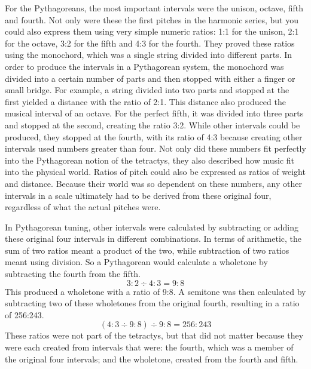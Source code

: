 For the Pythagoreans, the most important intervals were the unison, octave, fifth and
fourth.  Not only were these the first pitches in the harmonic series, but you could also
express them using very simple numeric ratios: 1:1 for the unison, 2:1 for the octave, 3:2
for the fifth and 4:3 for the fourth. They proved these ratios using the monochord, which
was a single string divided into different parts.  In order to
produce the intervals in a Pythagorean system, the monochord was divided into a
certain number of parts and then stopped with either a finger or small bridge.  For
example, a string divided into two parts and stopped at the first yielded
a distance with the ratio of 2:1.  This distance also produced the musical interval of
an octave.  For the perfect fifth, it was divided into three parts and stopped at the
second, creating the ratio 3:2.  While other intervals could be produced, they stopped
at the fourth, with its ratio of 4:3 because creating other intervals used numbers greater
than four.  Not only did these numbers fit perfectly into the
Pythagorean notion of the tetractys, they also described how music fit into the physical
world.  Ratios of pitch could also be expressed as ratios of weight and distance. Because
their world was so dependent on these numbers, any other intervals in a scale ultimately
had to be derived from these original four, regardless of what the actual pitches were.\autocite[274]{CN:1}

In Pythagorean tuning, other intervals were calculated by subtracting or adding these
original four intervals in different combinations.  In terms of arithmetic, the sum of two
ratios meant a product of the two, while subtraction of two ratios meant using division.
So a Pythagorean would calculate a wholetone by subtracting the fourth from the fifth.
\begin{equation}
3:2 \div 4:3 = 9:8
\end{equation}
This produced a wholetone with a ratio of 9:8. A semitone was then calculated by
subtracting two of these wholetones from the original fourth, resulting in a ratio
of 256:243. 
\begin{equation}
    (4:3 \div 9:8) \div 9:8 = 256:243
\end{equation}
These ratios were not part of the tetractys,
but that did not matter because they were each created from intervals that
were: the fourth, which was a member of the original four intervals; and the
wholetone, created from the fourth and fifth.

